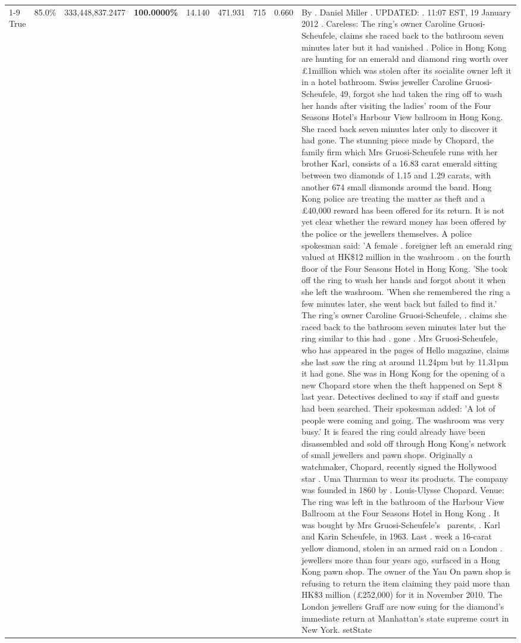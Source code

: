 \begin{table}[H]
\begin{tabular}{lllrlllll}
\cline{1-9}
True & 85.0\% & 333,448,837.2477 & \bfseries \color{red} 100.0000\% & 14.140 & 471.931 & 715 & 0.660 & By . Daniel Miller . UPDATED: . 11:07 EST, 19 January 2012 . Careless: The ring's owner Caroline Gruosi-Scheufele, claims she raced back to the bathroom seven minutes later but it had vanished . Police in Hong Kong are hunting for an emerald and diamond ring worth over £1million which was stolen after its socialite owner left it in a hotel bathroom. Swiss jeweller Caroline Gruosi-Scheufele, 49, forgot she had taken the ring off to wash her hands after visiting the ladies' room of the Four Seasons Hotel's Harbour View ballroom in Hong Kong. She raced back seven minutes later only to discover it had gone. The stunning piece made by Chopard, the family firm which Mrs Gruosi-Scheufele runs with her brother Karl, consists of a 16.83 carat emerald sitting between two diamonds of 1.15 and 1.29 carats, with another 674 small diamonds around the band. Hong Kong police are treating the matter as theft and a £40,000 reward has been offered for its return. It is not yet clear whether the reward money has been offered by the police or the jewellers themselves. A police spokesman said: 'A female . foreigner left an emerald ring valued at HK\$12 million in the washroom . on the fourth floor of the Four Seasons Hotel in Hong Kong. 'She took off the ring to wash her hands and forgot about it when she left the washroom. 'When she remembered the ring a few minutes later, she went back but failed to find it.' The ring's owner Caroline Gruosi-Scheufele, . claims she raced back to the bathroom seven minutes later but the ring similar to this had . gone . Mrs Gruosi-Scheufele, who has appeared in the pages of Hello magazine, claims she last saw the ring at around 11.24pm but by 11.31pm it had gone. She was in Hong Kong for the opening of a new Chopard store when the theft happened on Sept 8 last year. Detectives declined to say if staff and guests had been searched. Their spokesman added: 'A lot of people were coming and going. The washroom was very busy.' It is feared the ring could already have been disassembled and sold off through Hong Kong's network of small jewellers and pawn shops. Originally a watchmaker, Chopard, recently signed the Hollywood star . Uma Thurman to wear its products. The company was founded in 1860 by . Louis-Ulysse Chopard. Venue: The ring was left in the bathroom of the Harbour View Ballroom at the Four Seasons Hotel in Hong Kong . It was bought by Mrs Gruosi-Scheufele's  parents, . Karl and Karin Scheufele, in 1963. Last . week a 16-carat yellow diamond, stolen in an armed raid on a London . jewellers more than four years ago, surfaced in a Hong Kong pawn shop. The owner of the Yau On pawn shop is refusing to return the item claiming they paid more than HK\$3 million (£252,000) for it in November 2010. The London jewellers Graff are now suing for the diamond’s immediate return at Manhattan’s state supreme court in New York. setState \\

\end{tabular}
\end{table}
